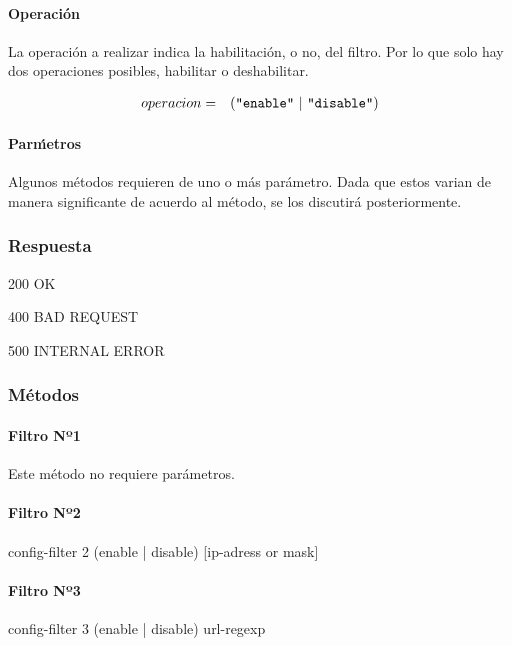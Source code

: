 \documentclass[a4paper,10pt]{article}
\begin{document}
            \paragraph*{Operaci\'on}
            La operaci\'on a realizar indica la habilitaci\'on, o no, del filtro. Por lo que solo hay dos operaciones posibles, habilitar o deshabilitar.

            \begin{eqnarray*}
                operacion & = & (\verb+"enable"+\,\,|\,\,\verb+"disable"+)\nonumber\\
            \end{eqnarray*}
            
            \paragraph*{Par\'metros}
            Algunos m\'etodos requieren de uno o m\'as par\'ametro. Dada que estos varian de manera significante de acuerdo al m\'etodo, se los discutir\'a 
            posteriormente.
        
        \subsubsection{Respuesta}

        200 OK

        400 BAD REQUEST

        500 INTERNAL ERROR


        \subsubsection{M\'etodos}
        
            \paragraph*{Filtro Nº1}

            Este m\'etodo no requiere par\'ametros.

            \paragraph*{Filtro Nº2}
             config-filter 2 (enable | disable) [ip-adress or mask]

            \paragraph*{Filtro Nº3}
            config-filter 3 (enable | disable) url-regexp
\end{document}

